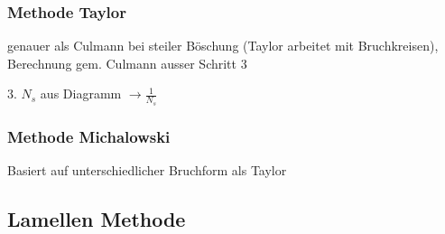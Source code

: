 \subsubsection{Methode Taylor}

	\begin{minipage}{\linewidth}
		genauer als Culmann bei steiler Böschung (Taylor arbeitet mit Bruchkreisen), Berechnung gem. Culmann ausser Schritt 3
		
		\hspace{0.5cm} 3. $ N_s $ aus Diagramm $ \rightarrow \frac{1}{N_s} $
	\end{minipage}

\subsubsection{Methode Michalowski}
	\begin{minipage}{\linewidth}
		Basiert auf unterschiedlicher Bruchform als Taylor \\
	\end{minipage}





\subsection{Lamellen Methode}

